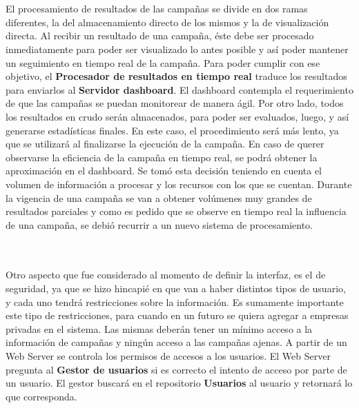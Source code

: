 \documentclass[a4paper, 11pt]{article}
\begin{document}
\\
\\
El procesamiento de resultados de las campañas se divide en dos ramas diferentes, la del almacenamiento directo de los mismos y la de visualización directa. 
Al recibir un resultado de una campaña, éste debe ser procesado inmediatamente para poder ser visualizado lo antes posible y así poder mantener un seguimiento en tiempo real de la campaña. Para poder cumplir con ese objetivo, el \textbf{Procesador de resultados en tiempo real} traduce los resultados para enviarlos al \textbf{Servidor dashboard}. El dashboard contempla el requerimiento de que las campañas se puedan monitorear de manera ágil. %
Por otro lado, todos los resultados en crudo serán almacenados, para poder ser evaluados, luego, y así generarse estadísticas finales. 
En este caso, el procedimiento será más lento, ya que se utilizará al finalizarse la ejecución de la campaña. En caso de querer observarse la eficiencia de la campaña en tiempo real, se podrá obtener la aproximación en el dashboard. 
Se tomó esta decisión teniendo en cuenta el volumen de información a procesar y los recursos con los que se cuentan. Durante la vigencia de una campaña se van a obtener volúmenes muy grandes de resultados parciales y como es pedido que se observe en tiempo real la influencia de una campaña, se debió recurrir a un nuevo sistema de procesamiento.


\\
\\
Otro aspecto que fue considerado al momento de definir la interfaz, es el de seguridad, ya que se hizo hincapié en que van a haber distintos tipos de usuario, y cada uno tendrá restricciones sobre la información. Es sumamente importante este tipo de restricciones, para cuando en un futuro se quiera agregar a empresas privadas en el sistema. Las mismas deberán tener un mínimo acceso a la información de campañas y ningún acceso a las campañas ajenas. A partir de un Web Server se controla los permisos de accesos a los usuarios. El Web Server pregunta al \textbf{Gestor de usuarios} si es correcto el intento de acceso por parte de un usuario. El gestor buscará en el repositorio \textbf{Usuarios} al usuario y retornará lo que corresponda. 
\\
\\
\end{document}
